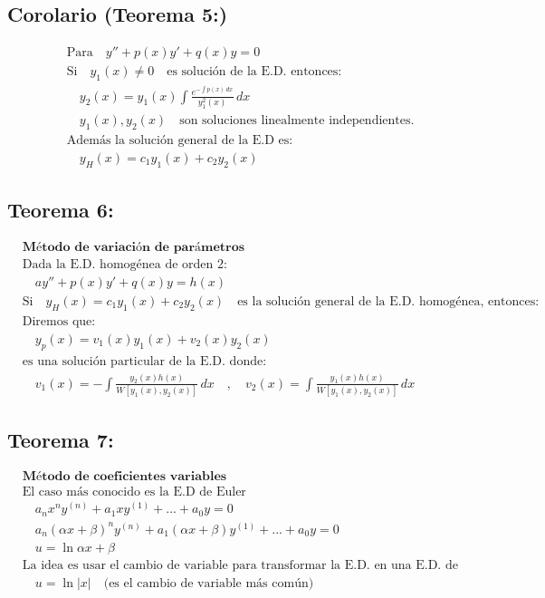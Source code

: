 \documentclass[a4paper,12pt,numbers=noenddot]{scrreprt}
\begin{document}
\subsection*{Corolario (Teorema 5:)}
\begin{align*}
    &\text{Para} \quad y'' + p(x)y' + q(x)y = 0 \\
    &\text{Si} \quad y_1(x) \not = 0 \quad \text{es solución de la E.D. entonces:}\\
    &\quad y_2(x) = y_1(x) \int \frac{e^{-\int p(x)\,dx}}{y_1^2(x)} \,dx\\
    &\quad {y_1(x), y_2(x)} \quad \text{son soluciones linealmente independientes.}\\
    &\text{Además la solución general de la E.D es:}\\
    &\quad y_H(x) = c_1y_1(x) + c_2y_2(x)
\end{align*}

\subsection*{Teorema 6:}
\begin{align*}
    &\textbf{Método de variación de parámetros}\\
    &\text{Dada la E.D. homogénea de orden 2:}\\
    &\quad a y'' + p(x) y' + q(x) y = h(x)\\
    &\text{Si} \quad y_H(x) = c_1y_1(x) + c_2y_2(x) \quad \text{es la solución general de la E.D. homogénea, entonces:}\\
    &\text{Diremos que:}\\
    &\quad y_p(x) = v_1(x)y_1(x) + v_2(x)y_2(x)\\
    &\text{es una solución particular de la E.D. donde:}\\
    &\quad v_1(x) = -\int \frac{y_2(x)h(x)}{W[y_1(x),y_2(x)]} \,dx \quad , \quad v_2(x) = \int \frac{y_1(x)h(x)}{W[y_1(x),y_2(x)]} \,dx
\end{align*}

\subsection*{Teorema 7:}
\begin{align*}
    &\textbf{Método de coeficientes variables}\\
    &\text{El caso más conocido es la E.D de Euler}\\
    &\quad a_n x^n y^{(n)} + a_{1} x y^{(1)} + ... + a_0 y = 0\\
    &\quad a_n(\alpha x + \beta)^n y^{(n)} + a_{1}(\alpha x + \beta) y^{(1)} + ... + a_0 y = 0\\
    &\quad u = \ln{\alpha x + \beta}\\
    &\text{La idea es usar el cambio de variable para transformar la E.D. en una E.D. de coeficientes constantes.}\\
    &\quad u= \ln |x| \quad \text{(es el cambio de variable más común)}
\end{align*} 
\end{document}
